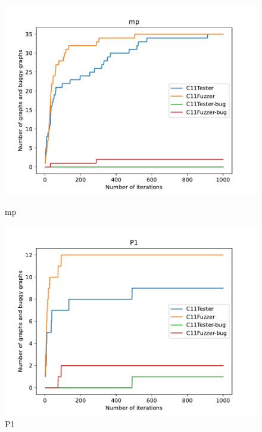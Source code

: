\begin{figure}[H]
	\begin{minipage}{0.45\textwidth}
		\centering
		\includegraphics[width=\textwidth]{figure/hardbug/mp_bug.pdf}
		\caption{mp}
		\label{hardbug:mp}
	\end{minipage}
	\hfill
	\begin{minipage}{0.45\textwidth}
		\centering
		\includegraphics[width=\textwidth]{figure/hardbug/P1_bug.pdf}
		\caption{P1}
		\label{header:P1}
	\end{minipage}

	\vspace{0.5cm}


\end{figure}
